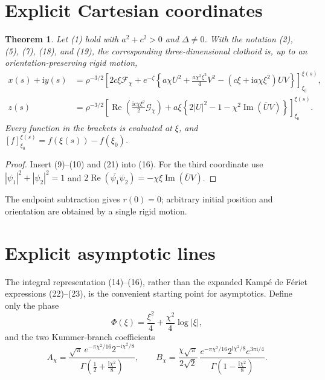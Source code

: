 \documentclass[11pt]{article}
\newtheorem{theorem}{Theorem}
\newcommand{\ii}{\mathrm i}
\newcommand{\Rea}{\operatorname{Re}}
\newcommand{\Ima}{\operatorname{Im}}
\newcommand{\br}[3]{\left[#1\right]_{#2}^{#3}}
\begin{document}
\section{Explicit Cartesian coordinates}
\begin{theorem}
Let (1) hold with \(a^2+c^2>0\) and \(\Delta\ne0\). With the notation (2), (5), (7), (18), and (19), the corresponding three-dimensional clothoid is, up to an orientation-preserving rigid motion,
\begin{align}
 x(s)+\ii y(s)
 &=\rho^{-3/2}\br{
 2c\xi\mathcal F_\chi+e^{-\zeta}\left\{
 a\chi U^2+\frac{a\chi^3\xi^2}{4}V^2-(c\xi+\ii a\chi\xi^2)UV
 \right\}}{\xi_0}{\xi(s)}, \tag{22}\\[1mm]
 z(s)
 &=\rho^{-3/2}\br{
 \Rea\left(\frac{\ii c\chi\xi^2}{2}\mathcal G_\chi\right)
 +a\xi\left\{2|U|^2-1-\chi^2\Ima(\overline{U}V)\right\}}{\xi_0}{\xi(s)}. \tag{23}
\end{align}
Every function in the brackets is evaluated at \(\xi\), and \(\br{f}{\xi_0}{\xi(s)}=f(\xi(s))-f(\xi_0)\).
\end{theorem}
\begin{proof}
Insert (9)--(10) and (21) into (16). For the third coordinate use \(|\psi_1|^2+|\psi_2|^2=1\) and
\(2\Rea(\overline{\psi_1}\psi_2)=-\chi\xi\Ima(\overline{U}V)\).
\end{proof}
The endpoint subtraction gives \(r(0)=0\); arbitrary initial position and orientation are obtained by a single rigid motion.

\section{Explicit asymptotic lines}
The integral representation (14)--(16), rather than the expanded Kamp\'e de F\'eriet expressions (22)--(23), is the convenient starting point for asymptotics. Define only the phase
\begin{equation}
 \Phi(\xi)=\frac{\xi^2}{4}+\frac{\chi^2}{4}\log|\xi|, \tag{24}
\end{equation}
and the two Kummer-branch coefficients
\begin{equation}
 A_\chi=
 \frac{\sqrt\pi\,e^{-\pi\chi^2/16}2^{-\ii\chi^2/8}}
 {\Gamma(\frac12+\frac{\ii\chi^2}{8})},\qquad
 B_\chi=
 \frac{\chi\sqrt\pi}{2\sqrt2}\,
 \frac{e^{-\pi\chi^2/16}2^{\ii\chi^2/8}e^{3\pi\ii/4}}
 {\Gamma(1-\frac{\ii\chi^2}{8})}. \tag{25}
\end{equation}
\end{document}
